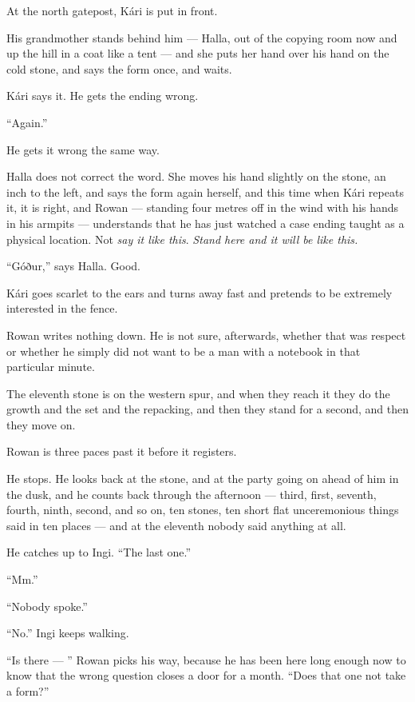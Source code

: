 \documentclass[11pt,oneside]{book}
\newcommand{\sceneline}{%
  \par\vspace{1.2em}
  \begin{center}
    \fontsize{11}{11}\selectfont \textbullet\quad\textbullet\quad\textbullet
  \end{center}
  \vspace{0.6em}\noindent\ignorespaces
}
\begin{document}
At the north gatepost, Kári is put in front.

His grandmother stands behind him --- Halla, out of the copying room now
and up the hill in a coat like a tent --- and she puts her hand over his
hand on the cold stone, and says the form once, and waits.

Kári says it. He gets the ending wrong.

``Again.''

He gets it wrong the same way.

Halla does not correct the word. She moves his hand slightly on the
stone, an inch to the left, and says the form again herself, and this
time when Kári repeats it, it is right, and Rowan --- standing four
metres off in the wind with his hands in his armpits --- understands
that he has just watched a case ending taught as a physical location.
Not \emph{say it like this}. \emph{Stand here and it will be like
this.}

``Góður,'' says Halla. Good.

Kári goes scarlet to the ears and turns away fast and pretends to be
extremely interested in the fence.

Rowan writes nothing down. He is not sure, afterwards, whether that was
respect or whether he simply did not want to be a man with a notebook in
that particular minute.

\sceneline

The eleventh stone is on the western spur, and when they reach it they
do the growth and the set and the repacking, and then they stand for a
second, and then they move on.

Rowan is three paces past it before it registers.

He stops. He looks back at the stone, and at the party going on ahead
of him in the dusk, and he counts back through the afternoon --- third,
first, seventh, fourth, ninth, second, and so on, ten stones, ten short
flat unceremonious things said in ten places --- and at the eleventh
nobody said anything at all.

He catches up to Ingi. ``The last one.''

``Mm.''

``Nobody spoke.''

``No.'' Ingi keeps walking.

``Is there --- '' Rowan picks his way, because he has been here long
enough now to know that the wrong question closes a door for a month.
``Does that one not take a form?''
\end{document}
